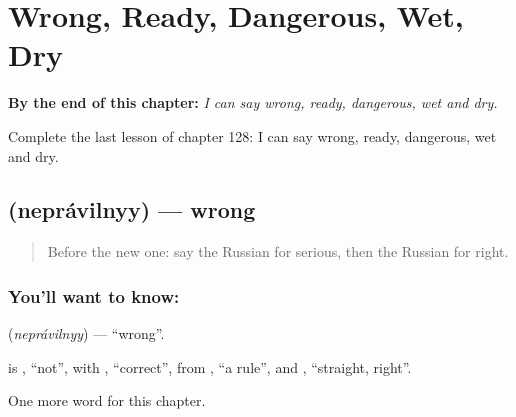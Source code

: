 
\chapter{Wrong, Ready, Dangerous, Wet, Dry}
\label{ch:ru-wrong-ready-dangerous-wet-dry}

\begin{chapteropening}
\textbf{By the end of this chapter:} \emph{I can say wrong, ready, dangerous, wet and dry.}

Complete the last lesson of chapter 128: I can say wrong, ready, dangerous, wet and dry.
\end{chapteropening}

\section[\texorpdfstring{\ru{неправильный} (neprávilnyy)}{неправильный (neprávilnyy)}]{ (neprávilnyy) — wrong}

\label{lesson:RU-C128-wrong}



\begin{quote}
Before the new one: say the Russian for serious, then the Russian for right.
\end{quote}

\subsection*{You'll want to know: }
\textbf{} (\emph{neprávilnyy}) — \textquotedblleft{}wrong\textquotedblright{}.

\begin{cousinweb}
\textbf{} is \emph{}, \textquotedblleft{}not\textquotedblright{}, with \emph{}, \textquotedblleft{}correct\textquotedblright{}, from \emph{}, \textquotedblleft{}a rule\textquotedblright{}, and \emph{}, \textquotedblleft{}straight, right\textquotedblright{}.
\end{cousinweb}

\begin{grammarlens}[title={What you've built}]
One more word for this chapter.
\end{grammarlens}

